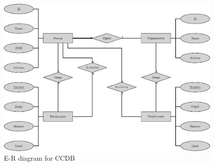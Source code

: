 \documentclass{article}
\begin{document}
\begin{figure}[!htp]
\centering
\includegraphics[width=\textwidth]{E-R.eps}
\caption{E-R diagram for CCDB}
\end{figure}
\end{document}
